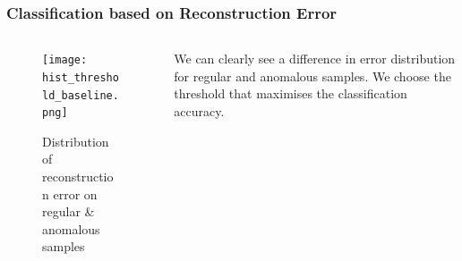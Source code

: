 \begin{frame}
    \frametitle{Classification based on Reconstruction Error}

    \begin{columns}
        \begin{column}{0.48\textwidth}
        \begin{figure}
            \centering
            \texttt{[image: hist\_threshold\_baseline.png]}
            \caption{Distribution of reconstruction error on regular \& anomalous samples}
        \end{figure}
    \end{column}
    \begin{column}{0.48\textwidth}
        We can clearly see a \alert{difference in error distribution} for regular and anomalous samples. We choose the \alert{threshold that maximises the classification} accuracy.
    \end{column}
    \end{columns}

\end{frame}